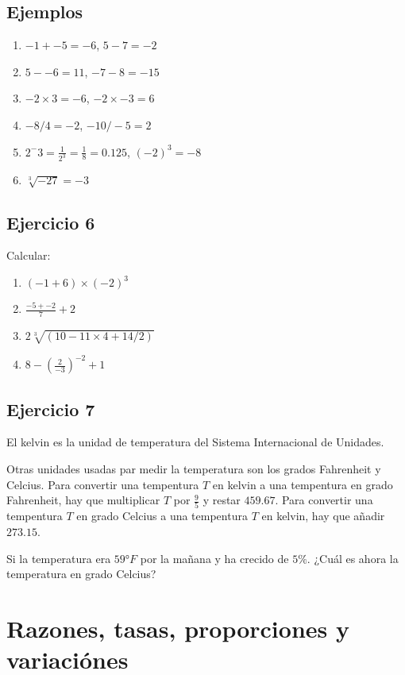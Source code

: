 \subsection*{Ejemplos}

\begin{enumerate}
\item $-1 + -5 = -6$, $5 - 7 = -2$
\item $5 - -6 = 11$, $-7 - 8 = -15$
\item $-2 \times 3 = -6$, $-2 \times -3 = 6$
\item $-8 / 4 = -2$, $-10 / -5 = 2$
\item $2^-3 = \frac{1}{2^3} = \frac{1}{8} = 0.125$, ${(-2)}^{3} = -8$
\item $\sqrt[3]{-27} = -3$
\end{enumerate}

\subsection*{Ejercicio 6}

Calcular:

\begin{enumerate}
\item ${(-1 + 6)} \times {(-2)}^3$
\item $\frac{-5 + -2}{7} + 2$
\item $2 \sqrt[3]{(10 - 11 \times 4 + 14 / 2)}$
\item $8 - \left(\frac{2}{-3}\right)^{-2} + 1$
\end{enumerate}

\subsection*{Ejercicio 7}

El kelvin es la unidad de temperatura del Sistema Internacional de Unidades.

Otras unidades usadas par medir la temperatura son los grados Fahrenheit y
Celcius. Para convertir una tempentura $T$ en kelvin a una tempentura en grado
Fahrenheit, hay que multiplicar $T$ por $\frac{9}{5}$ y restar $459.67$.
Para convertir una tempentura $T$ en grado Celcius a una tempentura $T$ en
kelvin, hay que añadir $273.15$.

Si la temperatura era $59°F$ por la mañana y ha crecido de $5\%$. ¿Cuál es ahora
la temperatura en grado Celcius?

\section{Razones, tasas, proporciones y variaciónes}

